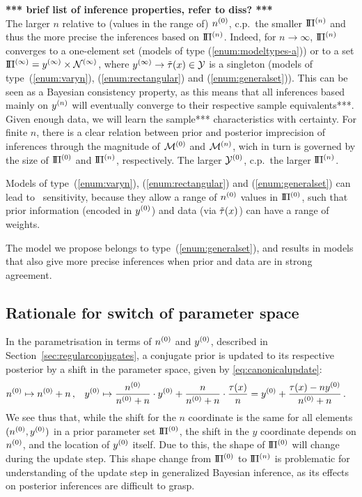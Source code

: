 \textbf{*** brief list of inference properties, refer to diss? ***}\\
The larger $n$ relative to (values in the range of) $n^{(0)}$,
c.p.\ the smaller $\text{I}\!\Pi^{(n)}$ and thus the more precise the inferences based on $\text{I}\!\Pi^{(n)}$.
Indeed, for $n \to  \infty$, $\text{I}\!\Pi^{(n)}$ converges to a one-element set (models of type (\ref{enum:modeltypes-a}))
or to a set $\text{I}\!\Pi^{(\infty)} = y^{(\infty)} \times \mathcal{N}^{(\infty)}$,
where $y^{(\infty)} \to \tilde{\tau}(x) \in \mathcal{Y}$ is a singleton 
(models of type~(\ref{enum:varyn}), (\ref{enum:rectangular}) and (\ref{enum:generalset})).
This can be seen as a Bayesian consistency property, as this means that all inferences based mainly on $y^{(n)}$
will eventually converge to their respective sample equivalents***.
Given enough data, we will learn the sample*** characteristics with certainty.
For finite $n$, there is a clear relation between prior and posterior imprecision of inferences
through the magnitude of $\mathcal{M}^{(0)}$ and $\mathcal{M}^{(n)}$, wich in turn is governed by the size of $\text{I}\!\Pi^{(0)}$ and $\text{I}\!\Pi^{(n)}$, respectively.
The larger $\mathcal{Y}^{(0)}$, c.p.\ the larger $\text{I}\!\Pi^{(n)}$.


Models of type~(\ref{enum:varyn}), (\ref{enum:rectangular}) and (\ref{enum:generalset}) can lead to \pdc\ sensitivity,
because they allow a range of $n^{(0)}$ values in $\text{I}\!\Pi^{(0)}$,
such that prior information (encoded in $y^{(0)}$) and data (via $\tilde{\tau}(x)$) can have a range of weights.

The model we propose belongs to type~(\ref{enum:generalset}),
and results in models that also give more precise inferences when prior and data are in strong agreement.



\subsection{Rationale for switch of parameter space}
\label{sec:rationale-for-miks-world}

In the parametrisation in terms of $n^{(0)}$ and $y^{(0)}$, described in Section~\ref{sec:regularconjugates},
a conjugate prior is updated to its respective posterior by a shift in the parameter space,
given by \eqref{eq:canonicalupdate}:
\begin{align*}
n^{(0)} &\mapsto n^{(0)} + n\,, &
y^{(0)} &\mapsto \frac{n^{(0)}}{n^{(0)} + n} \cdot y^{(0)} + \frac{n}{n^{(0)} + n} \cdot \frac{\tau(x)}{n} = y^{(0)} + \frac{\tau(x)-ny^{(0)}}{n^{(0)}+n}\,.
\end{align*}
We see thus that, while the shift for the $n$ coordinate is the same for all elements $(n^{(0)},y^{(0)})$
in a prior parameter set $\text{I}\!\Pi^{(0)}$,
the shift in the $y$ coordinate depends on $n^{(0)}$, and the location of $y^{(0)}$ itself.
Due to this, the shape of $\text{I}\!\Pi^{(0)}$ will change during the update step.
This shape change from $\text{I}\!\Pi^{(0)}$ to $\text{I}\!\Pi^{(n)}$ is problematic for understanding of the update step in generalized Bayesian inference,
as its effects on posterior inferences are difficult to grasp.

